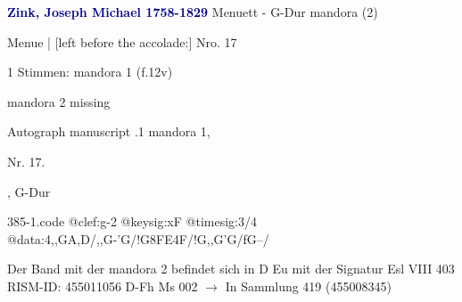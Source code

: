 \documentclass[twocolumn]{book}
\begin{document}
\newline \par \vspace{7pt} \textcolor{darkblue}{\textbf{Zink, Joseph Michael  1758-1829}}
\newline Menuett - G-Dur
\newline mandora (2)
\newline \begin{itshape}[f.12v, at left:] Menue | [left before the accolade:] Nro. 17\end{itshape} 
\newline \textcolor{darkblue}{}  1 Stimmen: mandora 1  (f.12v)
\newline \begin{small} mandora 2 missing\end{small} 
\newline Autograph manuscript
.1  mandora 1, \begin{itshape}Nr. 17.\end{itshape}, G-Dur  
\begin{filecontents*}{385-1.code}
@clef:g-2
@keysig:xF
@timesig:3/4
@data:4,,GA,D/,,G-'G/!G{8FE}4F/!G,,G'G/fG--/
\end{filecontents*}
\newline
%
\newline Der Band mit der mandora 2 befindet sich in D Eu mit der Signatur Esl VIII 403
\newline RISM-ID: 455011056
\newline D-Fh  Ms 002
\newline $\rightarrow$ In Sammlung 419 (455008345)
      
\end{document}
